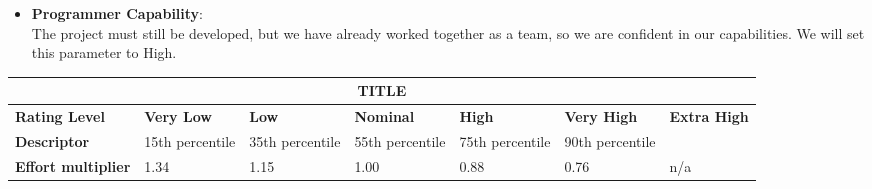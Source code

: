 \begin{itemize}
\item \textbf{Programmer Capability}:\\
The project must still be developed, but we have already worked together as a team, so we are confident in our capabilities. We will set this parameter to High.
\end{itemize}
\hspace*{-3cm}\begin{tabular}{|p{3cm}|p{2cm}|p{2cm}|p{2cm}|p{2cm}|p{2cm}|p{2cm}|}
\hline
\multicolumn{7}{|c|}{\textbf{TITLE}}\\
\hline
\hline
\textbf{Rating Level} & \textbf{Very Low} & \textbf{Low} & \textbf{Nominal} & \textbf{High} & \textbf{Very High} & \textbf{Extra High}\\
\hline
\textbf{Descriptor} & 15th percentile & 35th percentile & 55th percentile & 75th percentile & 90th percentile & \\
\hline
\textbf{Effort multiplier} & 1.34 & 1.15 & 1.00 & 0.88 & 0.76 & n/a\\
\hline 
\end{tabular}
